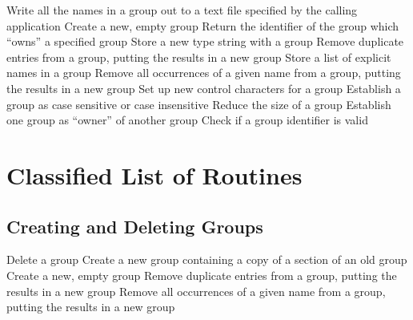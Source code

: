             {Write all the names in a group out to a text file specified by the
calling application}
            {Create a new, empty group}
            {Return the identifier of the group which ``owns'' a specified
group}
            {Store a new type string with a group}
            {Remove duplicate entries from a group, putting the results in a new
group}
            {Store a list of explicit names in a group}
            {Remove all occurrences of a given name from a group, putting the results in a new group}
            {Set up new control characters for a group}
            {Establish a group as case sensitive or case insensitive}
            {Reduce the size of a group}
            {Establish one group as ``owner'' of another group}
            {Check if a group identifier is valid}

\section{Classified List of Routines}

\subsection{Creating and Deleting Groups}

            {Delete a group}
            {Create a new group containing a copy of a section of an old group}
            {Create a new, empty group}
            {Remove duplicate entries from a group, putting the results in a new
group}
            {Remove all occurrences of a given name from a group, putting the results in a new group}

